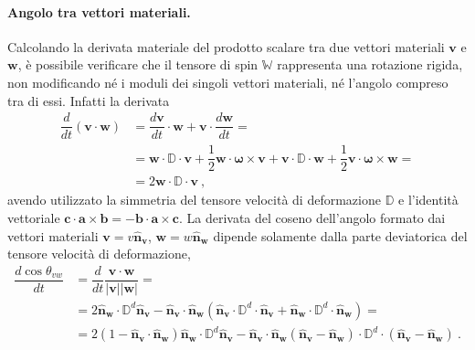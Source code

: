 \paragraph{Angolo tra vettori materiali.}
Calcolando la derivata materiale del prodotto scalare tra due vettori materiali $\bm{v}$ e $\bm{w}$, è possibile verificare che il tensore di spin $\mathbb{W}$ rappresenta una rotazione rigida, non modificando né i moduli dei singoli vettori materiali, né l'angolo compreso tra di essi. Infatti la derivata 
\begin{equation}
\begin{aligned}
 \dfrac{d}{dt} (\bm{v} \cdot \bm{w}) & = \dfrac{d\bm{v}}{dt} \cdot \bm{w} + \bm{v} \cdot \dfrac{d\bm{w}}{dt} = \\
  & = \bm{w} \cdot \mathbb{D} \cdot \bm{v} + \dfrac{1}{2} \bm{w} \cdot \bm{\omega} \times \bm{v} + 
   \bm{v} \cdot \mathbb{D} \cdot \bm{w} + \dfrac{1}{2} \bm{v} \cdot \bm{\omega} \times \bm{w} = \\
   & = 2 \bm{w} \cdot \mathbb{D} \cdot \bm{v} \ ,
\end{aligned}
\end{equation}
avendo utilizzato la simmetria del tensore velocità di deformazione $\mathbb{D}$ e l'identità vettoriale $\bm{c} \cdot \bm{a} \times \bm{b} = - \bm{b} \cdot \bm{a} \times \bm{c}$.
\newline
La derivata del coseno dell'angolo formato dai vettori materiali $\bm{v} = v \bm{\hat{n}_v}$, $\bm{w} = w \bm{\hat{n}_w}$ dipende solamente dalla parte deviatorica del tensore velocità di deformazione,
\begin{equation}
\begin{aligned}
 \dfrac{d \cos \theta_{vw}}{dt} & = \dfrac{d}{d t} \dfrac{\bm{v} \cdot \bm{w}}{|\bm{v}||\bm{w}|} = \\
  & = 2 \bm{\hat{n}_w} \cdot \mathbb{D}^d \bm{\hat{n}_v} - \bm{\hat{n}_v} \cdot \bm{\hat{n}_w} (\bm{\hat{n}_v} \cdot \mathbb{D}^d \cdot \bm{\hat{n}_v} + \bm{\hat{n}_w} \cdot \mathbb{D}^d \cdot \bm{\hat{n}_w} ) = \\
  & = 2 (1 - \bm{\hat{n}_v} \cdot \bm{\hat{n}_w}) \bm{\hat{n}_w} \cdot \mathbb{D}^d \bm{\hat{n}_v} - \bm{\hat{n}_v} \cdot \bm{\hat{n}_w} (\bm{\hat{n}_v} - \bm{\hat{n}_w}) \cdot \mathbb{D}^d \cdot (\bm{\hat{n}_v} - \bm{\hat{n}_w}) \ .
\end{aligned}
\end{equation}

